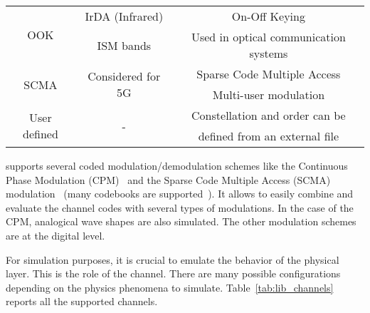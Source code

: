 \begin{table}[htp]
\begin{tabular}{ c | c | c }
  \hline
  \multirow{2}{*}{{OOK}}          & IrDA (Infrared)                    & On-Off Keying                             \\
                                  & ISM bands                          & Used in optical communication systems     \\
  \hline
  \multirow{2}{*}{{SCMA}}         & \multirow{2}{*}{Considered for 5G} & Sparse Code Multiple Access               \\
                                  &                                    & Multi-user modulation                     \\
  \hline
  \multirow{2}{*}{{User defined}} & \multirow{2}{*}{-}                 & Constellation and order can be            \\
                                  &                                    & defined from an external file             \\
  \end{tabular}
\end{table}

\AFFECT supports several coded modulation/demodulation schemes like the
Continuous Phase Modulation (CPM)~\cite{Aulin1981a,Aulin1981b} and the Sparse
Code Multiple Access (SCMA) modulation~\cite{Nikopour2013,Ghaffari2017,
Ghaffari2019} (many codebooks are supported~\cite{AlteraSCMA,Wu2015,Cheng2015,
Zhang2016,Klimentyev2016,Song2017,Klimentyev2017}). It allows to easily combine
and evaluate the channel codes with several types of modulations. In the case of
the CPM, analogical wave shapes are also simulated. The other modulation schemes
are at the digital level.

For simulation purposes, it is crucial to emulate the behavior of the physical
layer. This is the role of the channel. There are many possible configurations
depending on the physics phenomena to simulate.
Table~\ref{tab:lib_channels} reports all the supported channels.

